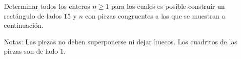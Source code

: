  Determinar todos los enteros $n\ge1$ para los cuales es posible construir un rectángulo de lados $15$ y $n$ con piezas congruentes a las que se muestran a continuación. 
    
    Notas:
   Las piezas no deben superponerse ni dejar huecos.
   Los cuadritos de las piezas son de lado $1$.

